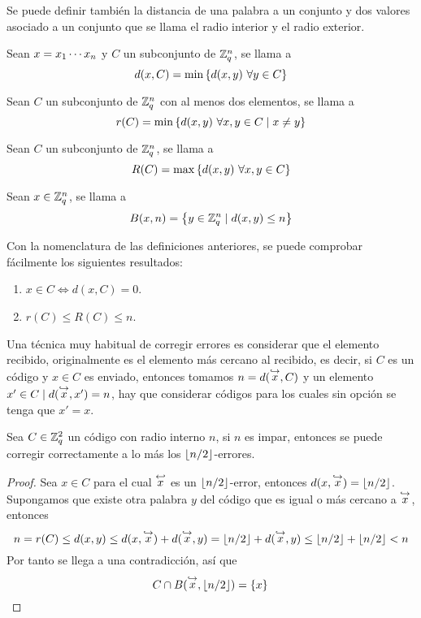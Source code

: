 Se puede definir también la distancia de una palabra a un conjunto y dos valores asociado a un conjunto que se llama el radio interior y el radio exterior.

\begin{definition}
	Sean $x=x_1\cdots x_{n}$ y $C$ un subconjunto de $\mathbb{Z}_q^n$, se llama  a
	\[
		d(x, C) = \min\left\{d(x,y)\ \forall y\in C\right\}
	\]
\end{definition}

\begin{definition}
	Sean $C$ un subconjunto de $\mathbb{Z}_q^n$ con al menos dos elementos, se llama  a
	\[
		r(C) = \min\left\{d(x,y)\ \forall x,y\in C\mid x\neq y\right\}
	\]
\end{definition}

\begin{definition}
	Sean $C$ un subconjunto de $\mathbb{Z}_q^n$, se llama  a
	\[
		R(C) = \max\left\{d(x,y)\ \forall x,y\in C\right\}
	\]
\end{definition}

\begin{definition}
	Sean $x\in\mathbb{Z}_q^n$, se llama  a
	\[
		B(x, n) = \left\{y\in\mathbb{Z}_q^n \mid d(x,y)\leq n\right\}
	\]
\end{definition}

Con la nomenclatura de las definiciones anteriores, se puede comprobar fácilmente los siguientes resultados:
\begin{enumerate}
	\item $x\in C \iff d(x, C) = 0$.
	\item $r(C)\leq R(C) \leq n$.
\end{enumerate}

Una técnica muy habitual de corregir errores es considerar que el elemento recibido, originalmente es el elemento más cercano al recibido, es decir, si $C$ es un código y $x\in C$ es enviado, entonces tomamos $n=d(\stackrel{\hookrightarrow}{x}, C)$ y un elemento $x'\in C\mid d(\stackrel{\hookrightarrow}{x}, x')=n$, hay que considerar códigos para los cuales sin opción se tenga que $x'=x$.

\begin{lemma}
	Sea $C\in\mathbb{Z}_q^2$ un código con radio interno $n$, si $n$ es impar, entonces se puede corregir correctamente a lo más los $\lfloor n/2 \rfloor$-errores.
\end{lemma}
\begin{proof}
	Sea $x\in C$ para el cual $\stackrel{\hookleftarrow}{x}$ es un $\lfloor n/2 \rfloor$-error, entonces $d(x, \stackrel{\hookrightarrow}{x})=\lfloor n/2 \rfloor$.
	Supongamos que existe otra palabra $y$ del código que es igual o más cercano a $\stackrel{\hookrightarrow}{x}$, entonces
	\[
		n = r(C) \leq d(x, y) \leq d(x, \stackrel{\hookrightarrow}{x}) + d(\stackrel{\hookrightarrow}{x}, y) = \lfloor n/2 \rfloor + d(\stackrel{\hookrightarrow}{x}, y) \leq \lfloor n/2 \rfloor + \lfloor n/2 \rfloor < n
	\]
	Por tanto se llega a una contradicción, así que
	\[
		C\cap B(\stackrel{\hookrightarrow}{x}, \lfloor n/2 \rfloor) = \left\{x\right\}\qedhere
	\]
\end{proof}

